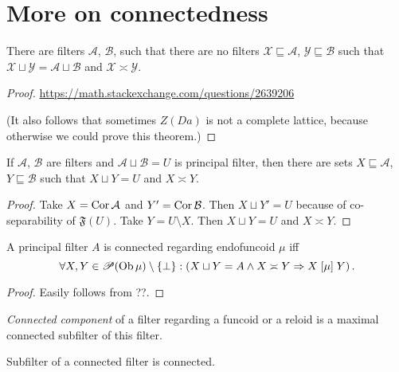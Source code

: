 \chapter{More on connectedness}

\begin{prop}
  There are filters $\mathcal{A}$, $\mathcal{B}$, such that there are no
  filters $\mathcal{X} \sqsubseteq \mathcal{A}$, $\mathcal{Y} \sqsubseteq
  \mathcal{B}$ such that $\mathcal{X} \sqcup \mathcal{Y} = \mathcal{A} \sqcup
  \mathcal{B}$ and $\mathcal{X} \asymp \mathcal{Y}$.
\end{prop}

\begin{proof}
  \url{https://math.stackexchange.com/questions/2639206}

  (It also follows that sometimes $Z (D a)$ is not a complete lattice, because
  otherwise we could prove this theorem.)
\end{proof}

\begin{prop}
  If $\mathcal{A}$, $\mathcal{B}$ are filters and $\mathcal{A} \sqcup
  \mathcal{B} = U$ is principal filter, then there are sets $X \sqsubseteq
  \mathcal{A}$, $Y \sqsubseteq \mathcal{B}$ such that $X \sqcup Y = U$ and $X
  \asymp Y$.
\end{prop}

\begin{proof}
  Take $X = \operatorname{Cor} \mathcal{A}$ and $Y' = \operatorname{Cor} \mathcal{B}$. Then $X
  \sqcup Y' = U$ because of co-separability of $\mathfrak{F} (U)$. Take $Y = U
  \setminus X$. Then $X \sqcup Y = U$ and $X \asymp Y$.
\end{proof}

\begin{prop}
  A principal filter $A$ is connected regarding endofuncoid $\mu$ iff
  \[ \forall X, Y \in \mathscr{P} (\operatorname{Ob} \mu) \setminus \{ \bot \} :
     \left( X \sqcup Y = A \wedge X \asymp Y \Rightarrow X \mathrel{[\mu]} Y
     \right) . \]
\end{prop}

\begin{proof}
  Easily follows from ??.
\end{proof}

\begin{defn}
  \emph{Connected component} of a filter regarding a funcoid or a reloid
  is a maximal
  connected subfilter of this filter.
\end{defn}

\begin{obvious}
Subfilter of a connected filter is connected.
\end{obvious}

